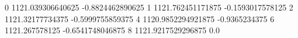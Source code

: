 0 1121.039306640625 -0.8824462890625
1 1121.762451171875 -0.1593017578125
2 1121.32177734375 -0.5999755859375
4 1120.9852294921875 -0.9365234375
6 1121.267578125 -0.6541748046875
8 1121.9217529296875 0.0
